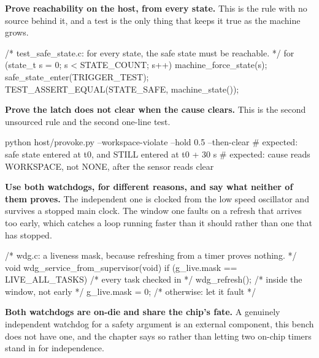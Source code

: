 \begin{steps}
\item \textbf{Prove reachability on the host, from every state.} This is the
rule with no source behind it, and a test is the only thing that keeps it true
as the machine grows.
\begin{ccode}
/* test_safe_state.c: for every state, the safe state must be reachable. */
for (state_t s = 0; s < STATE_COUNT; s++) {
    machine_force_state(s);
    safe_state_enter(TRIGGER_TEST);
    TEST_ASSERT_EQUAL(STATE_SAFE, machine_state());
}
\end{ccode}

\item \textbf{Prove the latch does not clear when the cause clears.} This is the
second unsourced rule and the second one-line test.
\begin{shellcode}
python host/provoke.py --workspace-violate --hold 0.5 --then-clear
# expected: safe state entered at t0, and STILL entered at t0 + 30 s
# expected: cause reads WORKSPACE, not NONE, after the sensor reads clear
\end{shellcode}

\item \textbf{Use both watchdogs, for different reasons, and say what neither of
them proves.} The independent one is clocked from the low speed oscillator and
survives a stopped main clock. The window one faults on a refresh that arrives
too early, which catches a loop running faster than it should rather than one
that has stopped.
\begin{ccode}
/* wdg.c: a liveness mask, because refreshing from a timer proves nothing. */
void wdg_service_from_supervisor(void)
{
    if (g_live.mask == LIVE_ALL_TASKS) {    /* every task checked in */
        wdg_refresh();                      /* inside the window, not early */
        g_live.mask = 0;
    }                                       /* otherwise: let it fault */
}
\end{ccode}
\textbf{Both watchdogs are on-die and share the chip's fate.} A genuinely
independent watchdog for a safety argument is an external component, this bench
does not have one, and the chapter says so rather than letting two on-chip
timers stand in for independence.


\end{steps}
